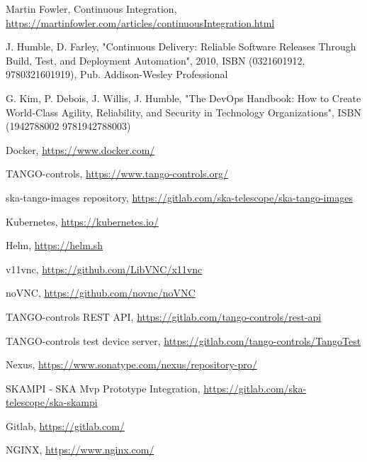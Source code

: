 \documentclass[a4paper,
               keeplastbox,   %
               ]{jacow}
\begin{document}
%
	{\printbibliography}%
	{%
	
	\begin{thebibliography}{99} %
	
		Martin Fowler, Continuous Integration,
		\url{https://martinfowler.com/articles/continuousIntegration.html}
	
		J. Humble, D. Farley, "Continuous Delivery: Reliable Software Releases Through Build, Test, and Deployment Automation",
		2010, ISBN (0321601912, 9780321601919), Pub. Addison-Wesley Professional
	
		G. Kim, P. Debois, J. Willis, J. Humble, "The DevOps Handbook: How to Create World-Class Agility, Reliability, and Security in Technology Organizations", ISBN (1942788002 9781942788003)
	
		Docker, 
		\url{https://www.docker.com/}
	
		TANGO-controls,
		\url{https://www.tango-controls.org/}
	
		ska-tango-images repository,
		\url{https://gitlab.com/ska-telescope/ska-tango-images}
	
		Kubernetes,
		\url{https://kubernetes.io/}
	
		Helm,
		\url{https://helm.sh}
	
		v11vnc,
		\url{https://github.com/LibVNC/x11vnc}
	
		noVNC,
		\url{https://github.com/novnc/noVNC}
	
		TANGO-controls REST API,
		\url{https://gitlab.com/tango-controls/rest-api}
	
		TANGO-controls test device server,
		\url{https://gitlab.com/tango-controls/TangoTest}
	
		Nexus,
		\url{https://www.sonatype.com/nexus/repository-pro/}
	
		SKAMPI - SKA Mvp Prototype Integration,
		\url{https://gitlab.com/ska-telescope/ska-skampi}
	
		Gitlab,
		\url{https://gitlab.com/}
	
		NGINX,
		\url{https://www.nginx.com/}
	

\end{thebibliography}}
\end{document}
